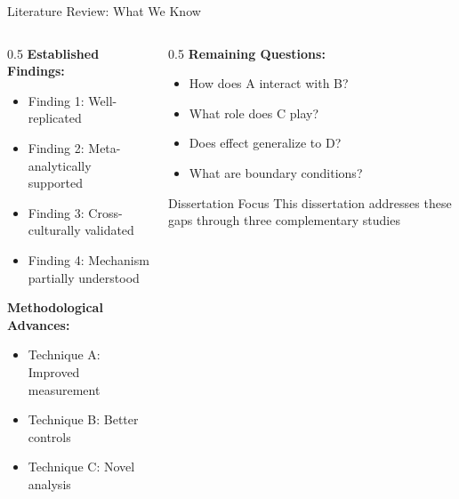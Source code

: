 \documentclass[aspectratio=169,12pt]{beamer}
\begin{document}
\begin{frame}{Literature Review: What We Know}
  \begin{columns}[T]
    
    \begin{column}{0.5\textwidth}
      \textbf{Established Findings:}
      \begin{itemize}
        \item Finding 1: Well-replicated
        \item Finding 2: Meta-analytically supported
        \item Finding 3: Cross-culturally validated
        \item Finding 4: Mechanism partially understood
      \end{itemize}
      
      \vspace{0.3cm}
      
      \textbf{Methodological Advances:}
      \begin{itemize}
        \item Technique A: Improved measurement
        \item Technique B: Better controls
        \item Technique C: Novel analysis
      \end{itemize}
    \end{column}
    
    \begin{column}{0.5\textwidth}
      \textbf{Remaining Questions:}
      \begin{itemize}
        \item[\alert{?}] How does A interact with B?
        \item[\alert{?}] What role does C play?
        \item[\alert{?}] Does effect generalize to D?
        \item[\alert{?}] What are boundary conditions?
      \end{itemize}
      
      \vspace{0.3cm}
      
      \begin{exampleblock}{Dissertation Focus}
        This dissertation addresses these gaps through three complementary studies
      \end{exampleblock}
    \end{column}
    
  \end{columns}
\end{frame}
\end{document}
